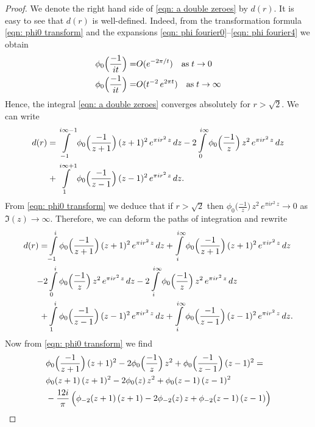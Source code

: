   \begin{proof}
  We denote the right hand side of \eqref{eqn: a double zeroes} by $d(r)$.  It is easy to see that $d(r)$ is well-defined. Indeed, from the transformation formula \eqref{eqn: phi0 transform} and the expansions \eqref{eqn: phi fourier0}--\eqref{eqn: phi fourier4} we obtain
  \begin{align}
  \phi_0\Big(\frac{-1}{it}\Big)=&O(e^{-2\pi/t})\quad\mbox{as}\;t\to 0\notag\\
  \phi_0\Big(\frac{-1}{it}\Big)=&O(t^{-2}\,e^{2\pi t})\quad\mbox{as}\;t\to \infty\notag
  \end{align}
  Hence, the integral \eqref{eqn: a double zeroes} converges absolutely for $r>\sqrt{2}$.
   We can write %
  \begin{align}
   d(r)=&\int\limits_{-1}^{i\infty-1}\phi_0\Big(\frac{-1}{z+1}\Big)\,(z+1)^2\,e^{\pi i r^2 \,z}\,dz-
   2\int\limits_{0}^{i\infty}\phi_0\Big(\frac{-1}{z}\Big)\,z^2\,e^{\pi i r^2 \,z}\,dz\notag\\
   +&\int\limits_{1}^{i\infty+1}\phi_0\Big(\frac{-1}{z-1}\Big)\,(z-1)^2\,e^{\pi i r^2 \,z}\,dz.\notag
  \end{align}
  From \eqref{eqn: phi0 transform} we deduce that if $r>\sqrt{2}$ then
  $\phi_0\Big(\frac{-1}{z}\Big)\,z^2\,e^{\pi i r^2 \,z}\to 0$ as $\Im(z)\to\infty$. Therefore, we can deform the paths of integration
  and rewrite
  \begin{align}
   d(r)=&\int\limits_{-1}^{i}\phi_0\Big(\frac{-1}{z+1}\Big)\,(z+1)^2\,e^{\pi i r^2 \,z}\,dz
   +\int\limits_{i}^{i\infty}\phi_0\Big(\frac{-1}{z+1}\Big)\,(z+1)^2\,e^{\pi i r^2 \,z}\,dz\notag\\
   -2&\int\limits_{0}^{i}\phi_0\Big(\frac{-1}{z}\Big)\,z^2\,e^{\pi i r^2 \,z}\,dz
   -2\int\limits_{i}^{i\infty}\phi_0\Big(\frac{-1}{z}\Big)\,z^2\,e^{\pi i r^2 \,z}\,dz\notag\\
   +&\int\limits_{1}^{i}\phi_0\Big(\frac{-1}{z-1}\Big)\,(z-1)^2\,e^{\pi i r^2 \,z}\,dz
   +\int\limits_{i}^{i\infty}\phi_0\Big(\frac{-1}{z-1}\Big)\,(z-1)^2\,e^{\pi i r^2 \,z}\,dz.\notag
  \end{align}
  Now from \eqref{eqn: phi0 transform} we find
  \begin{align}&\phi_0\Big(\frac{-1}{z+1}\Big)\,(z+1)^2-2\phi_0\Big(\frac{-1}{z}\Big)\,z^2+
  \phi_0\Big(\frac{-1}{z-1}\Big)\,(z-1)^2=\notag\\
  &\phi_0(z+1)\,(z+1)^2-2\phi_0(z)\,z^2+\phi_0(z-1)\,(z-1)^2\notag\\
  &-\frac{12i}{\pi}\,\Big(\phi_{-2}(z+1)\,(z+1)-2\phi_{-2}(z)\,z+\phi_{-2}(z-1)\,(z-1)\Big)\notag\\

\end{align}
\end{proof}

